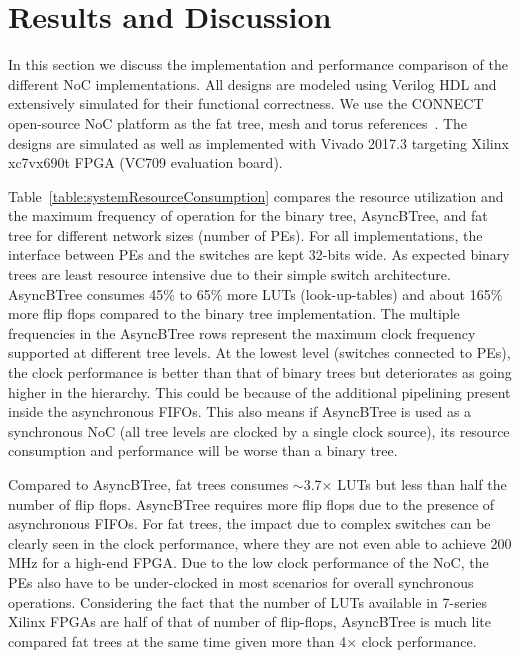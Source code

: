 \section{Results and Discussion}
\label{sec:result}

In this section we discuss the implementation and performance comparison of the different NoC implementations.
All designs are modeled using Verilog HDL and extensively simulated for their functional correctness.
We use the CONNECT open-source NoC platform as the fat tree, mesh and torus references~\cite{papa_connect_fpga2012}.
The designs are simulated as well as implemented with Vivado 2017.3 targeting Xilinx xc7vx690t FPGA (VC709 evaluation board).


Table~\ref{table:systemResourceConsumption} compares the resource utilization and the maximum frequency of operation for the binary tree, AsyncBTree, and fat tree for different network sizes (number of PEs).
For all implementations, the interface between PEs and the switches are kept 32-bits wide.
As expected binary trees are least resource intensive due to their simple switch architecture.
AsyncBTree consumes 45\% to 65\% more LUTs (look-up-tables) and about 165\% more flip flops compared to the binary tree implementation.
The multiple frequencies in the AsyncBTree rows represent the maximum clock frequency supported at different tree levels.
At the lowest level (switches connected to PEs), the clock performance is better than that of binary trees but deteriorates as going higher in the hierarchy.
This could be because of the additional pipelining present inside the asynchronous FIFOs.
This also means if AsyncBTree is used as a synchronous NoC (all tree levels are clocked by a single clock source), its resource consumption and performance will be worse than a binary tree. 

Compared to AsyncBTree, fat trees consumes $\sim$3.7$\times$ LUTs but less than half the number of flip flops.
AsyncBTree requires more flip flops due to the presence of asynchronous FIFOs.
For fat trees, the impact due to complex switches can be clearly seen in the clock performance, where they are not even able to achieve 200 MHz for a high-end FPGA.
Due to the low clock performance of the NoC, the PEs also have to be under-clocked in most scenarios for overall synchronous operations.
Considering the fact that the number of LUTs available in 7-series Xilinx FPGAs are half of that of number of flip-flops, AsyncBTree is much lite compared fat trees at the same time given more than 4$\times$ clock performance.

